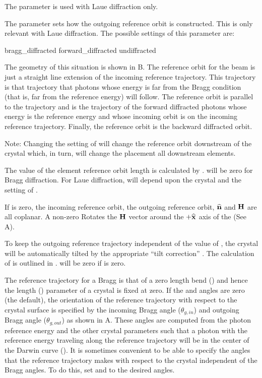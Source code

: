 The  parameter is used with Laue diffraction only.

The  parameter sets how the outgoing reference
orbit is constructed. This is only relevant with Laue diffraction.
The possible settings of this parameter are:
\begin{example}
  bragg_diffracted
  forward_diffracted
  undiffracted
\end{example}
The geometry of this situation is shown in B. The
reference orbit for the  beam is just a straight line
extension of the incoming reference trajectory. This trajectory is
that trajectory that photons whose energy is far from the Bragg
condition (that is, far from the reference energy) will follow. The
 reference orbit is parallel to the
 trajectory and is the trajectory of the forward
diffracted photons whose energy is the reference energy and whose
incoming orbit is on the incoming reference trajectory. Finally, the
 reference orbit is the backward diffracted orbit.

Note: Changing the setting of  will change the
reference orbit downstream of the crystal which, in turn, will change
the placement all downstream elements.

The value of the element reference orbit length  is calculated
by \bmad.  will be zero for Bragg diffraction. For Laue
diffraction,  will depend upon the crystal  and
the setting of .

If  is zero, the incoming reference orbit, the outgoing
reference orbit, ${\widehat{\bf n}}$ and ${\bf H}$ are all coplanar. A non-zero
 Rotates the ${\bf H}$ vector around the $+{\widehat{\bf x}}$ axis
of the  (See A).

To keep the outgoing reference trajectory independent of the value of
, the crystal will be automatically tilted by the
appropriate ``tilt correction'' . The calculation of
 is outlined in . 
will be zero if  is zero.

The reference trajectory for a Bragg  is that of a zero length bend
() and hence the length () parameter of a crystal is fixed at zero. If
the  and  angles are zero (the default), the orientation of
the reference trajectory with respect to the crystal surface is specified by the incoming Bragg
angle  ($\theta_{g,in}$) and outgoing Bragg angle 
($\theta_{g,out}$) as shown in A. These angles are computed from the photon reference
energy and the other crystal parameters such that a photon with the reference energy traveling along
the reference trajectory will be in the center of the Darwin curve (). It
is sometimes convenient to be able to specify the angles that the reference trajectory makes with
respect to the crystal independent of the Bragg angles. To do this, set  and
 to the desired angles.

